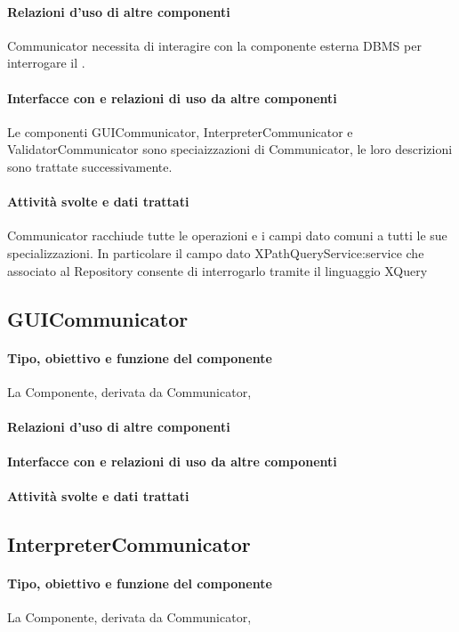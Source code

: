 \documentclass[11pt,titlepage,a4paper]{report}
\begin{document}
\paragraph{Relazioni d'uso di altre componenti}
Communicator necessita di interagire con la componente esterna DBMS per interrogare il \re.
\paragraph{Interfacce con e relazioni di uso da altre componenti}
Le componenti GUICommunicator, InterpreterCommunicator e ValidatorCommunicator sono speciaizzazioni di Communicator, le loro descrizioni sono trattate successivamente.
\paragraph{Attivit\`a svolte e dati trattati}
Communicator racchiude tutte le operazioni e i campi dato comuni a tutti le sue specializzazioni. In particolare il campo dato XPathQueryService:service che associato al Repository consente di interrogarlo tramite il linguaggio XQuery

\subsection{GUICommunicator}
\paragraph{Tipo, obiettivo e funzione del componente}
La Componente, derivata da Communicator,
\paragraph{Relazioni d'uso di altre componenti}
\paragraph{Interfacce con e relazioni di uso da altre componenti}
\paragraph{Attivit\`a svolte e dati trattati}

\subsection{InterpreterCommunicator}
\paragraph{Tipo, obiettivo e funzione del componente}
La Componente, derivata da Communicator,
\end{document}
